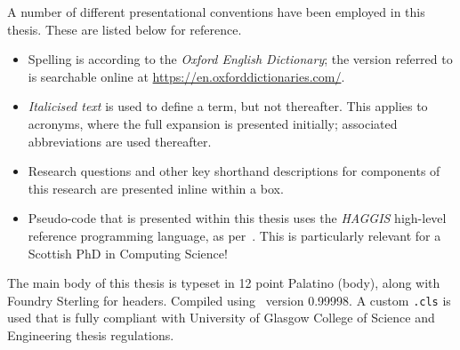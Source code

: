 
\begin{preamble}
{}

A number of different presentational conventions have been employed in this thesis. These are listed below for reference.

\begin{itemize}
    
    \item{Spelling is according to the \emph{Oxford English Dictionary}; the version referred to is searchable online at \url{https://en.oxforddictionaries.com/}.}
    
    \item{\emph{Italicised text} is used to define a term, but not thereafter. This applies to acronyms, where the full expansion is presented initially; associated abbreviations are used thereafter.}
    
    \item{Research questions and other key shorthand descriptions for components of this research are presented inline within a  box.}
    
    \item{Pseudo-code that is presented within this thesis uses the \emph{HAGGIS} high-level reference programming language, as per~\cite{cutts2014haggis}. This is particularly relevant for a Scottish PhD in Computing Science!}
    
\end{itemize}


The main body of this thesis is typeset in 12 point Palatino (body), along with \metafont\selectfont Foundry Sterling for headers. \normalfont\selectfont Compiled using \XeTeX\ version 0.99998. A custom \texttt{.cls} is used that is fully compliant with University of Glasgow College of Science and Engineering thesis regulations.


\end{preamble}
